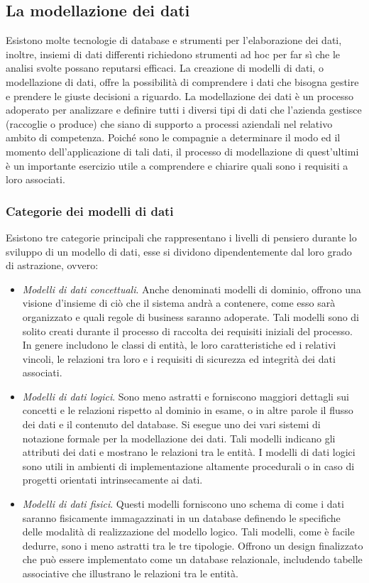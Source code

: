 \subsection{La modellazione dei dati}
Esistono molte tecnologie di database e strumenti per l'elaborazione dei dati, inoltre, insiemi di dati differenti richiedono strumenti ad hoc per far sì che le analisi svolte possano reputarsi efficaci. La creazione di modelli di dati, o modellazione di dati, offre la possibilità di comprendere i dati che bisogna gestire e prendere le giuste decisioni a riguardo.\cite{aws_data_modeling}
La modellazione dei dati è un processo adoperato per analizzare e definire tutti i diversi tipi di dati che l'azienda gestisce (raccoglie o produce) che siano di supporto a processi aziendali nel relativo ambito di competenza. Poiché sono le compagnie a determinare il modo ed il momento dell'applicazione di tali dati, il processo di modellazione di quest'ultimi è un importante esercizio utile a comprendere e chiarire quali sono i requisiti a loro associati.\cite{microsoft_data_modeling}

\subsubsection{Categorie dei modelli di dati}

Esistono tre categorie principali che rappresentano i livelli di pensiero durante lo sviluppo di un modello di dati, esse si dividono dipendentemente dal loro grado di astrazione, ovvero:\cite{ibm_data_modeling}

\begin{itemize}
    \item \textit{Modelli di dati concettuali}. Anche denominati modelli di dominio, offrono una visione d'insieme di ciò che il sistema andrà a contenere, come esso sarà organizzato e quali regole di business saranno adoperate. Tali modelli sono di solito creati durante il processo di raccolta dei requisiti iniziali del processo. In genere includono le classi di entità, le loro caratteristiche ed i relativi vincoli, le relazioni tra loro e i requisiti di sicurezza ed integrità dei dati associati.
    \item \textit{Modelli di dati logici}. Sono meno astratti e forniscono maggiori dettagli sui concetti e le relazioni rispetto al dominio in esame, o in altre parole il flusso dei dati e il contenuto del database. Si esegue uno dei vari sistemi di notazione formale per la modellazione dei dati. Tali modelli indicano gli attributi dei dati e mostrano le relazioni tra le entità. I modelli di dati logici sono utili in ambienti di implementazione altamente procedurali o in caso di progetti orientati intrinsecamente ai dati.
    \item \textit{Modelli di dati fisici}. Questi modelli forniscono uno schema di come i dati saranno fisicamente immagazzinati in un database definendo le specifiche delle modalità di realizzazione del modello logico. Tali modelli, come è facile dedurre, sono i meno astratti tra le tre tipologie. Offrono un design finalizzato che può essere implementato come un database relazionale, includendo tabelle associative che illustrano le relazioni tra le entità.
\end{itemize}

